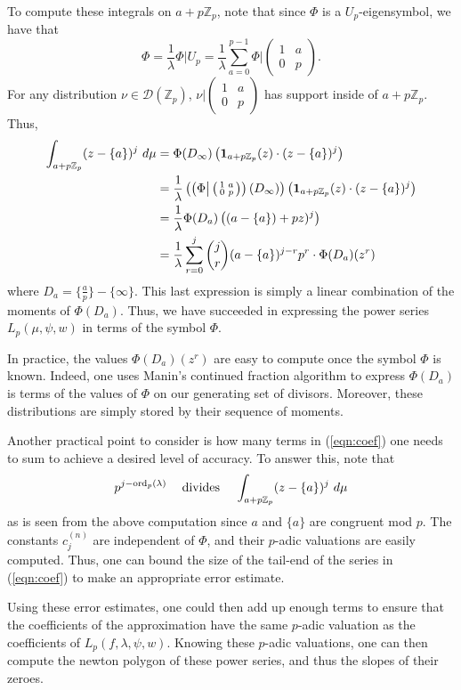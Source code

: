 \documentclass{amsart}
\theoremstyle{plain}
\theoremstyle{definition}
\newcommand{\D}{{\mathcal D}}
\newcommand{\Z}{{\mathbb Z}}
\newcommand{\Zp}{\Z_p}
\newcommand{\psmallmat}[4]{\left( \begin{smallmatrix} #1 & #2 \\ #3 & #4 \end{smallmatrix} \right)}
\renewcommand{\binom}[2]{\genfrac{(}{)}{0pt}{}{#1}{#2}}
\newcommand{\Dla}{\D(\Zp)}
\DeclareMathOperator{\ord}{ord}
\begin{document}
To compute these integrals on $a+p\Zp$, note that since $\Phi$ is a $U_p$-eigensymbol, we have that
$$
\Phi = \frac{1}{\lambda} \Phi \big| U_p = \frac{1}{\lambda} \sum_{a=0}^{p-1} \Phi \big| \psmallmat{1}{a}{0}{p}.
$$
For any distribution $\nu \in \Dla$, $\nu \big| \psmallmat{1}{a}{0}{p}$ has support inside of $a+p\Zp$.  Thus,
\begin{align*}
\int_{a+p\Zp} (z-\{a\})^j ~d\mu 
&= \Phi(D_\infty) \left( {\bf 1}_{a+p\Zp}(z) \cdot (z - \{a\})^j   \right) \\
&= \frac{1}{\lambda} \left( \left(\Phi \big| \psmallmat{1}{a}{0}{p}\right)\left(D_\infty\right) \right)\left( {\bf 1}_{a+p\Zp}(z) \cdot (z - \{a\})^j   \right) \\
&= \frac{1}{\lambda}  \Phi(D_{a})\left( (a - \{a\}) + pz)^j   \right) \\
&= \frac{1}{\lambda} \sum_{r=0}^j \binom{j}{r} (a-\{a\})^{j-r} p^r \cdot \Phi(D_{a})(z^r)
\end{align*}
where $D_{a} = \{\frac{a}{p}\} - \{\infty\}$.  
This last expression is simply a linear combination of the moments of $\Phi(D_{a})$.   Thus, we have succeeded in expressing the power series $L_p(\mu,\psi,w)$ in terms of the symbol $\Phi$.

In practice, the values $\Phi(D_{a})(z^r)$ are easy to compute once the symbol $\Phi$ is known.  Indeed, one uses Manin's continued fraction algorithm to express $\Phi(D_{a})$ is terms of the values of $\Phi$ on our generating set of divisors.  Moreover, these distributions are simply stored by their sequence of moments.

Another practical point to consider is how many terms in (\ref{eqn:coef}) one needs to sum to achieve a desired level of accuracy.  To answer this, note that 
$$
p^{j-\ord_p(\lambda)} \hspace{.2cm} \text{~~divides~~}
\hspace{.2cm}  \int_{a+p\Zp} (z-\{a\})^j ~d\mu
$$ 
as is seen from the above computation since $a$ and $\{a\}$ are congruent mod $p$.  The constants $c_j^{(n)}$ are independent of $\Phi$, and their $p$-adic valuations are easily computed.  Thus, one can bound the size of the tail-end of the series in (\ref{eqn:coef}) to make an appropriate error estimate.

Using these error estimates, one could then add up enough terms to ensure that the coefficients of the approximation have the same $p$-adic valuation as the coefficients of $L_p(f,\lambda,\psi,w)$.  Knowing these $p$-adic valuations, one can then compute the newton polygon of these power series, and thus the slopes of their zeroes.
\end{document}
